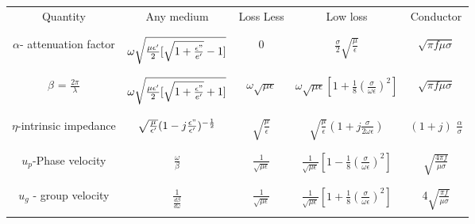 \documentclass[a4paper]{article}
\begin{document}
    \begin{tabular}{|c|c|c|c|c|}\hline
        Quantity & Any medium & Loss Less& Low loss&Conductor\\ &&&&\\ \hline&&&&\\
        $\alpha$- attenuation factor & $\omega \sqrt{\frac{\mu \epsilon^\prime }{2}[\sqrt{1+\frac{\epsilon"}{e^\prime}} -1]}   $ & 0 & \(\frac{\sigma}{2}\sqrt{\frac{\mu}{\epsilon }}  \) & \(\sqrt{\pi f \mu \sigma} \) \\ &&&&\\ \hline&&&&\\
        $\beta$ = \( \frac{2\pi}{\lambda}\) & $\omega \sqrt{\frac{\mu \epsilon^\prime }{2}[\sqrt{1+\frac{\epsilon"}{e^\prime}} +1]}$ & \(\omega \sqrt{\mu \epsilon } \)& \(\omega\sqrt{\mu \epsilon }[1+\frac{1}{8}\left(\frac{\sigma}{\omega \epsilon }\right)^2] \) & \(\sqrt{\pi f \mu \sigma} \) \\ &&&&\\ \hline&&&&\\
        $\eta$-intrinsic impedance & \(\sqrt{\frac{\mu}{\epsilon^\prime }}(1-j \frac{\epsilon "}{\epsilon ^\prime })^{-\frac{1}{2}}   \) & \(\sqrt{\frac{\mu}{\epsilon }} \) &\(\sqrt{\frac{\mu}{\epsilon }}(1+j \frac{\sigma}{2\omega \epsilon }) \) &$(1 + j)$ \(\frac{\alpha}{\sigma}\) \\ &&&&\\ \hline&&&&\\
        \(u_p\)-Phase velocity & \(\frac{\omega}{\beta} \) & \(\frac{1}{\sqrt{\mu \epsilon } }\) & \(\frac{1}{\sqrt{\mu \epsilon } }[1-\frac{1}{8}\left(\frac{\sigma}{\omega \epsilon }\right)^2]\) & \(\sqrt{\frac{4 \pi f }{\mu \sigma}} \)\\ &&&&\\ \hline&&&&\\
        \(u_g\) - group velocity & \(\frac{1}{\frac{d\beta}{d\omega}} \) & $\frac{1}{\sqrt{\mu \epsilon} }$ &\(\frac{1}{\sqrt{\mu \epsilon} }[1+\frac{1}{8}\left(\frac{\sigma}{\omega \epsilon }\right)^2]\) &4\(\sqrt{\frac{ \pi f }{\mu \sigma}} \)\\ &&&&\\\hline
    \end{tabular}
\end{document}
